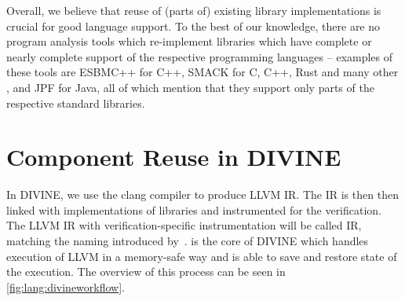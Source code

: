 Overall, we believe that reuse of (parts of) existing library implementations is crucial for good language support.
To the best of our knowledge, there are no program analysis tools which re-implement libraries which have complete or nearly complete support of the
respective programming languages -- examples of these tools are ESBMC++  for C++, SMACK for C, C++, Rust and many other , and JPF  for Java, all of which mention that they support only parts of the respective standard libraries.

\section{Component Reuse in DIVINE}\label{sec:lang:divine}

In DIVINE, we use the clang compiler to produce LLVM IR.
The IR is then then linked with implementations of libraries and instrumented for the verification.
The LLVM IR with verification-specific instrumentation will be called \divm IR,
matching the naming introduced by~.
\divm is the core of DIVINE which handles execution of LLVM in a memory-safe
way and is able to save and restore state of the execution.
The overview of this process can be seen in \autoref{fig:lang:divineworkflow}.

